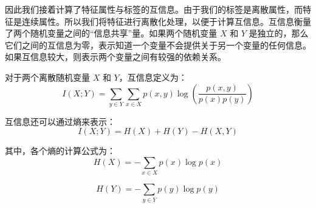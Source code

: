 因此我们接着计算了特征属性与标签的互信息。由于我们的标签是离散属性，而特征是连续属性。所以我们将特征进行离散化处理，以便于计算互信息。互信息衡量了两个随机变量之间的“信息共享”量。如果两个随机变量 $X$ 和 $Y$ 是独立的，那么它们之间的互信息为零，表示知道一个变量不会提供关于另一个变量的任何信息。如果互信息较大，则表示两个变量之间有较强的依赖关系。

对于两个离散随机变量 \(X\) 和 \(Y\)，互信息定义为：
\begin{equation}
	I(X; Y) = \sum_{y \in Y} \sum_{x \in X} p(x, y) \log \left(\frac{p(x, y)}{p(x) p(y)}\right)
	\label{eq:mutual_information}
\end{equation}

互信息还可以通过熵来表示：
\begin{equation}
	I(X; Y) = H(X) + H(Y) - H(X, Y)
	\label{eq:mutual_information_entropy}
\end{equation}

其中，各个熵的计算公式为：
\begin{equation}
	H(X) = -\sum_{x \in X} p(x) \log p(x)
	\label{eq:entropy_x}
\end{equation}

\begin{equation}
	H(Y) = -\sum_{y \in Y} p(y) \log p(y)
	\label{eq:entropy_y}
\end{equation}

